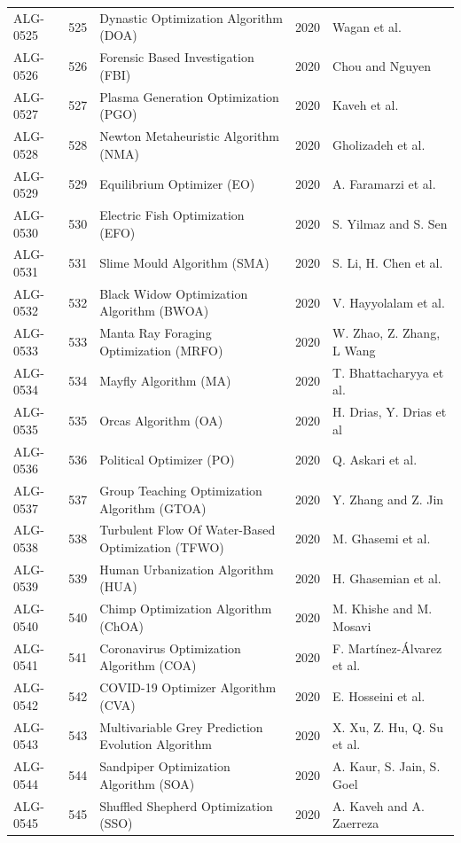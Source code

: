 \documentclass[8pt]{article}
\begin{document}
\begin{landscape}
\begin{longtable}{P{1.7cm}rP{10.0cm}rP{7.2cm}}
ALG-0525 & 525 & Dynastic Optimization Algorithm (DOA) & 2020 & Wagan et al. \\
ALG-0526 & 526 & Forensic Based Investigation (FBI) & 2020 & Chou and Nguyen \\
ALG-0527 & 527 & Plasma Generation Optimization (PGO) & 2020 & Kaveh et al. \\
ALG-0528 & 528 & Newton Metaheuristic Algorithm (NMA) & 2020 & Gholizadeh et al. \\
ALG-0529 & 529 & Equilibrium Optimizer (EO) & 2020 & A. Faramarzi et al. \\
ALG-0530 & 530 & Electric Fish Optimization (EFO) & 2020 & S. Yilmaz and S. Sen \\
ALG-0531 & 531 & Slime Mould Algorithm (SMA) & 2020 & S. Li, H. Chen et al. \\
ALG-0532 & 532 & Black Widow Optimization Algorithm (BWOA) & 2020 & V. Hayyolalam et al. \\
ALG-0533 & 533 & Manta Ray Foraging Optimization (MRFO) & 2020 & W. Zhao, Z. Zhang, L Wang \\
ALG-0534 & 534 & Mayfly Algorithm (MA) & 2020 & T. Bhattacharyya et al. \\
ALG-0535 & 535 & Orcas Algorithm (OA) & 2020 & H. Drias, Y. Drias et al \\
ALG-0536 & 536 & Political Optimizer (PO) & 2020 & Q. Askari et al. \\
ALG-0537 & 537 & Group Teaching Optimization Algorithm (GTOA) & 2020 & Y. Zhang and Z. Jin \\
ALG-0538 & 538 & Turbulent Flow Of Water-Based Optimization (TFWO) & 2020 & M. Ghasemi et al. \\
ALG-0539 & 539 & Human Urbanization Algorithm (HUA) & 2020 & H. Ghasemian et al. \\
ALG-0540 & 540 & Chimp Optimization Algorithm (ChOA) & 2020 & M. Khishe and M. Mosavi \\
ALG-0541 & 541 & Coronavirus Optimization Algorithm (COA) & 2020 & F. Martínez-Álvarez et al. \\
ALG-0542 & 542 & COVID-19 Optimizer Algorithm (CVA) & 2020 & E. Hosseini et al. \\
ALG-0543 & 543 & Multivariable Grey Prediction Evolution Algorithm & 2020 & X. Xu, Z. Hu, Q. Su et al. \\
ALG-0544 & 544 & Sandpiper Optimization Algorithm (SOA) & 2020 & A. Kaur, S. Jain, S. Goel \\
ALG-0545 & 545 & Shuffled Shepherd Optimization (SSO) & 2020 & A. Kaveh and A. Zaerreza \\

\end{longtable}
\end{landscape}
\end{document}
